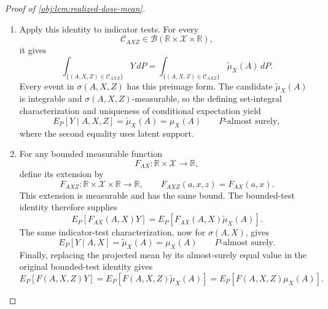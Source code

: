 \begin{proof}[Proof of \cref{obj:lem:realized-dose-mean}]
\begin{enumerate}
Substituting this equality into the two stratum sums proves, for every bounded measurable \(F\),
\[
E_P[F(A,X,Z)Y]
=
E_P[F(A,X,Z)\widetilde\mu_X(A)].
\]

\item Apply this identity to indicator tests. For every
\[
\mathcal C_{AXZ}\in\mathcal B(\mathbb R\times\mathcal X\times\mathbb R),
\]
it gives
\[
\int_{\{(A,X,Z)\in\mathcal C_{AXZ}\}}Y\,dP
=
\int_{\{(A,X,Z)\in\mathcal C_{AXZ}\}}\widetilde\mu_X(A)\,dP.
\]
Every event in \(\sigma(A,X,Z)\) has this preimage form. The candidate
\(\widetilde\mu_X(A)\) is integrable and \(\sigma(A,X,Z)\)-measurable, so the defining set-integral characterization and uniqueness of conditional expectation yield
\[
E_P[Y\mid A,X,Z]=\widetilde\mu_X(A)
=\mu_X(A)
\qquad P\text{-almost surely},
\]
where the second equality uses latent support.

\item For any bounded measurable function
\[
F_{AX}:\mathbb R\times\mathcal X\longrightarrow\mathbb R,
\]
define its extension by
\[
F_{AXZ}:\mathbb R\times\mathcal X\times\mathbb R\longrightarrow\mathbb R,
\qquad
F_{AXZ}(a,x,z)=F_{AX}(a,x).
\]
This extension is measurable and has the same bound. The bounded-test identity therefore supplies
\[
E_P[F_{AX}(A,X)Y]
=
E_P[F_{AX}(A,X)\widetilde\mu_X(A)].
\]
The same indicator-test characterization, now for \(\sigma(A,X)\), gives
\[
E_P[Y\mid A,X]=\widetilde\mu_X(A)
=\mu_X(A)
\qquad P\text{-almost surely}.
\]
Finally, replacing the projected mean by its almost-surely equal value in the original bounded-test identity gives
\[
E_P[F(A,X,Z)Y]
=
E_P[F(A,X,Z)\widetilde\mu_X(A)]
=
E_P[F(A,X,Z)\mu_X(A)].
\]
\end{enumerate}
\end{proof}

